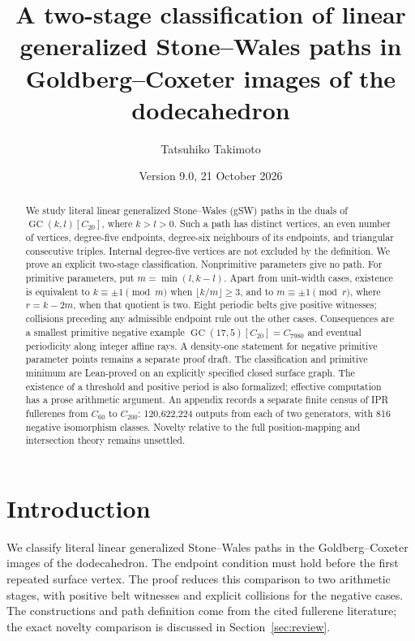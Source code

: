 \documentclass[11pt]{amsart}
\title[Two-stage classification of linear gSW paths]{A two-stage classification of linear generalized Stone--Wales paths in Goldberg--Coxeter images of the dodecahedron}
\author{Tatsuhiko Takimoto}
\date{Version 9.0, 21 October 2026}
\newcommand{\GC}{\operatorname{GC}}
\begin{document}
\begin{abstract}
We study literal linear generalized Stone--Wales (gSW) paths in the duals
of $\GC(k,l)[C_{20}]$, where $k>l>0$. Such a path has distinct vertices,
an even number of vertices, degree-five endpoints, degree-six neighbours
of its endpoints, and triangular consecutive triples. Internal
degree-five vertices are not excluded by the definition. We prove an
explicit two-stage classification. Nonprimitive
parameters give no path. For primitive parameters, put $m=\min(l,k-l)$.
Apart from unit-width cases, existence is equivalent to $k\equiv\pm1
\pmod m$ when $\lfloor k/m\rfloor\ge3$, and to $m\equiv\pm1\pmod r$,
where $r=k-2m$, when that quotient is two. Eight periodic belts give
positive witnesses; collisions preceding any admissible endpoint rule
out the other cases. Consequences are a smallest primitive negative
example $\GC(17,5)[C_{20}]=C_{7980}$ and eventual periodicity along integer
affine rays. A density-one statement for negative primitive parameter
points remains a separate proof draft. The classification and primitive
minimum are Lean-proved on an explicitly specified closed surface graph.
The existence of a threshold and positive period is also formalized;
effective computation has a prose arithmetic argument.
An appendix records a
separate finite census of IPR fullerenes from $C_{60}$ to $C_{200}$:
120,622,224 outputs from each of two generators, with 816 negative
isomorphism classes. Novelty
relative to the full position-mapping and intersection theory remains
unsettled.
\end{abstract}
\maketitle

\section{Introduction}
We classify literal linear generalized Stone--Wales paths in the
Goldberg--Coxeter images of the dodecahedron. The endpoint condition
must hold before the first repeated surface vertex. The proof reduces
this comparison to two arithmetic stages, with positive belt witnesses
and explicit collisions for the negative cases. The constructions and
path definition come from the cited fullerene literature; the exact
novelty comparison is discussed in Section~\ref{sec:review}.
\end{document}
